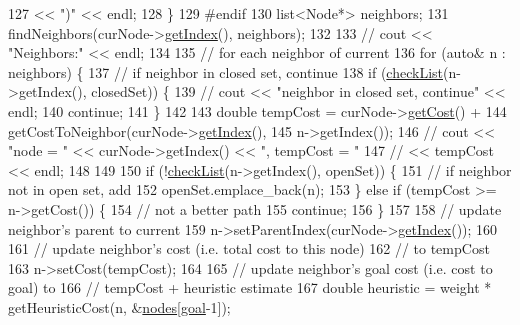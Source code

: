 \begin{DoxyCode}
127                  << \textcolor{stringliteral}{")"} << endl;
128         \}
129 \textcolor{preprocessor}{#endif}
130 \textcolor{preprocessor}{}        list<Node*> neighbors;
131         findNeighbors(curNode->\hyperlink{classNode_af157df6ef5c45d7ce978e9c7371c297e}{getIndex}(), neighbors);
132 
133         \textcolor{comment}{// cout << "Neighbors:" << endl;}
134 
135         \textcolor{comment}{// for each neighbor of current}
136         \textcolor{keywordflow}{for} (\textcolor{keyword}{auto}& n : neighbors) \{
137             \textcolor{comment}{// if neighbor in closed set, continue}
138             \textcolor{keywordflow}{if} (\hyperlink{AStarAlgorithm_8cpp_a79d7a8f837b09f62b8595c351f24f367}{checkList}(n->getIndex(), closedSet)) \{
139                 \textcolor{comment}{// cout << "neighbor in closed set, continue" << endl;}
140                 \textcolor{keywordflow}{continue};
141             \}
142 
143             \textcolor{keywordtype}{double} tempCost = curNode->\hyperlink{classNode_a06d6bc069a40309fb4d228af02dface4}{getCost}() +
144                               getCostToNeighbor(curNode->\hyperlink{classNode_af157df6ef5c45d7ce978e9c7371c297e}{getIndex}(),
145                                                 n->getIndex());
146             \textcolor{comment}{// cout << "node = " << curNode->getIndex() << ", tempCost = "}
147             \textcolor{comment}{//     << tempCost << endl;}
148 
149 
150             \textcolor{keywordflow}{if} (!\hyperlink{AStarAlgorithm_8cpp_a79d7a8f837b09f62b8595c351f24f367}{checkList}(n->getIndex(), openSet)) \{
151                 \textcolor{comment}{// if neighbor not in open set, add}
152                 openSet.emplace\_back(n);
153             \} \textcolor{keywordflow}{else} \textcolor{keywordflow}{if} (tempCost >= n->getCost()) \{
154                 \textcolor{comment}{// not a better path}
155                 \textcolor{keywordflow}{continue};
156             \}
157 
158             \textcolor{comment}{// update neighbor's parent to current}
159             n->setParentIndex(curNode->\hyperlink{classNode_af157df6ef5c45d7ce978e9c7371c297e}{getIndex}());
160 
161             \textcolor{comment}{// update neighbor's cost (i.e. total cost to this node)}
162             \textcolor{comment}{// to tempCost}
163             n->setCost(tempCost);
164 
165             \textcolor{comment}{// update neighbor's goal cost (i.e. cost to goal) to}
166             \textcolor{comment}{// tempCost + heuristic estimate}
167             \textcolor{keywordtype}{double} heuristic = weight * getHeuristicCost(n, &\hyperlink{classPathFindingAlgorithm_a3405321350d5fb10ba367c47944a7b77}{nodes}[\hyperlink{classPathFindingAlgorithm_ae8acf41f92ba72a969a44640c99fb8a4}{goal}-1]);

\end{DoxyCode}
